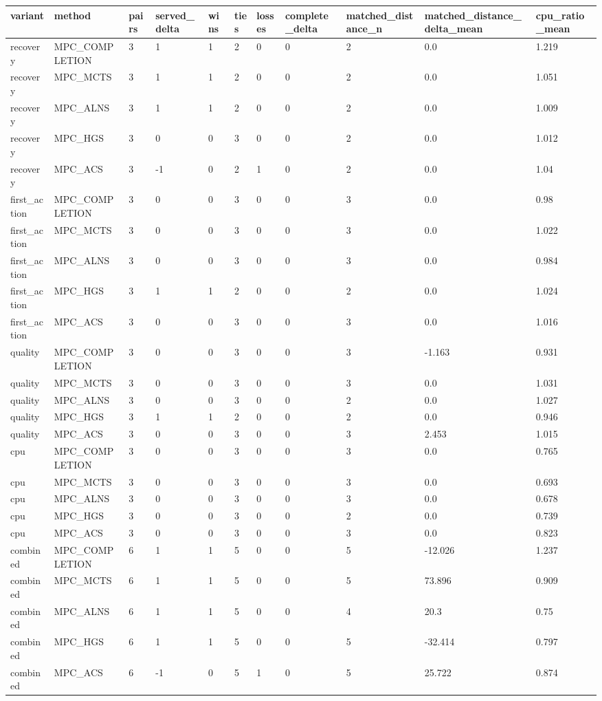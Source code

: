 \begin{tabular}{lllllllllll}
\hline
variant & method & pairs & served\_delta & wins & ties & losses & complete\_delta & matched\_distance\_n & matched\_distance\_delta\_mean & cpu\_ratio\_mean \\
\hline
recovery & MPC\_COMPLETION & 3 & 1 & 1 & 2 & 0 & 0 & 2 & 0.0 & 1.219 \\
recovery & MPC\_MCTS & 3 & 1 & 1 & 2 & 0 & 0 & 2 & 0.0 & 1.051 \\
recovery & MPC\_ALNS & 3 & 1 & 1 & 2 & 0 & 0 & 2 & 0.0 & 1.009 \\
recovery & MPC\_HGS & 3 & 0 & 0 & 3 & 0 & 0 & 2 & 0.0 & 1.012 \\
recovery & MPC\_ACS & 3 & -1 & 0 & 2 & 1 & 0 & 2 & 0.0 & 1.04 \\
first\_action & MPC\_COMPLETION & 3 & 0 & 0 & 3 & 0 & 0 & 3 & 0.0 & 0.98 \\
first\_action & MPC\_MCTS & 3 & 0 & 0 & 3 & 0 & 0 & 3 & 0.0 & 1.022 \\
first\_action & MPC\_ALNS & 3 & 0 & 0 & 3 & 0 & 0 & 3 & 0.0 & 0.984 \\
first\_action & MPC\_HGS & 3 & 1 & 1 & 2 & 0 & 0 & 2 & 0.0 & 1.024 \\
first\_action & MPC\_ACS & 3 & 0 & 0 & 3 & 0 & 0 & 3 & 0.0 & 1.016 \\
quality & MPC\_COMPLETION & 3 & 0 & 0 & 3 & 0 & 0 & 3 & -1.163 & 0.931 \\
quality & MPC\_MCTS & 3 & 0 & 0 & 3 & 0 & 0 & 3 & 0.0 & 1.031 \\
quality & MPC\_ALNS & 3 & 0 & 0 & 3 & 0 & 0 & 2 & 0.0 & 1.027 \\
quality & MPC\_HGS & 3 & 1 & 1 & 2 & 0 & 0 & 2 & 0.0 & 0.946 \\
quality & MPC\_ACS & 3 & 0 & 0 & 3 & 0 & 0 & 3 & 2.453 & 1.015 \\
cpu & MPC\_COMPLETION & 3 & 0 & 0 & 3 & 0 & 0 & 3 & 0.0 & 0.765 \\
cpu & MPC\_MCTS & 3 & 0 & 0 & 3 & 0 & 0 & 3 & 0.0 & 0.693 \\
cpu & MPC\_ALNS & 3 & 0 & 0 & 3 & 0 & 0 & 3 & 0.0 & 0.678 \\
cpu & MPC\_HGS & 3 & 0 & 0 & 3 & 0 & 0 & 2 & 0.0 & 0.739 \\
cpu & MPC\_ACS & 3 & 0 & 0 & 3 & 0 & 0 & 3 & 0.0 & 0.823 \\
combined & MPC\_COMPLETION & 6 & 1 & 1 & 5 & 0 & 0 & 5 & -12.026 & 1.237 \\
combined & MPC\_MCTS & 6 & 1 & 1 & 5 & 0 & 0 & 5 & 73.896 & 0.909 \\
combined & MPC\_ALNS & 6 & 1 & 1 & 5 & 0 & 0 & 4 & 20.3 & 0.75 \\
combined & MPC\_HGS & 6 & 1 & 1 & 5 & 0 & 0 & 5 & -32.414 & 0.797 \\
combined & MPC\_ACS & 6 & -1 & 0 & 5 & 1 & 0 & 5 & 25.722 & 0.874 \\
\hline
\end{tabular}
